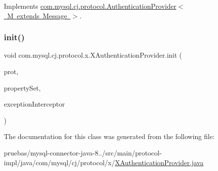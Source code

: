 Implements \mbox{\hyperlink{interfacecom_1_1mysql_1_1cj_1_1protocol_1_1_authentication_provider_ad030b0dc0784302f1221945aef2ae2e7}{com.\+mysql.\+cj.\+protocol.\+Authentication\+Provider$<$ M extends Message $>$}}.

\mbox{\label{classcom_1_1mysql_1_1cj_1_1protocol_1_1x_1_1_x_authentication_provider_a628e0d6b6faff2dec99b4ddb9f7cbb58}} 
\subsubsection{\texorpdfstring{init()}{init()}}
{\footnotesize\ttfamily void com.\+mysql.\+cj.\+protocol.\+x.\+X\+Authentication\+Provider.\+init (\begin{DoxyParamCaption}\item[{\mbox{\hyperlink{interfacecom_1_1mysql_1_1cj_1_1protocol_1_1_protocol}{Protocol}}$<$ \mbox{\hyperlink{classcom_1_1mysql_1_1cj_1_1protocol_1_1x_1_1_x_message}{X\+Message}} $>$}]{prot,  }\item[{\mbox{\hyperlink{interfacecom_1_1mysql_1_1cj_1_1conf_1_1_property_set}{Property\+Set}}}]{property\+Set,  }\item[{\mbox{\hyperlink{interfacecom_1_1mysql_1_1cj_1_1exceptions_1_1_exception_interceptor}{Exception\+Interceptor}}}]{exception\+Interceptor }\end{DoxyParamCaption})}



The documentation for this class was generated from the following file\+:\begin{DoxyCompactItemize}
\item 
pruebas/mysql-\/connector-\/java-\/8../src/main/protocol-\/impl/java/com/mysql/cj/protocol/x/\mbox{\hyperlink{_x_authentication_provider_8java}{X\+Authentication\+Provider.\+java}}\end{DoxyCompactItemize}
